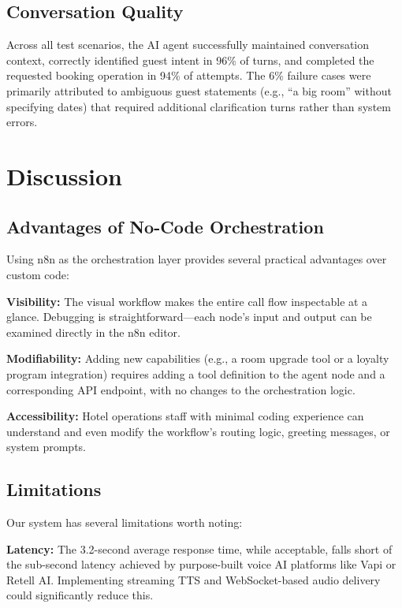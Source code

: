\documentclass[conference]{IEEEtran}
\begin{document}
\subsection{Conversation Quality}

Across all test scenarios, the AI agent successfully maintained conversation context, correctly identified guest intent in 96\% of turns, and completed the requested booking operation in 94\% of attempts. The 6\% failure cases were primarily attributed to ambiguous guest statements (e.g., ``a big room'' without specifying dates) that required additional clarification turns rather than system errors.

\section{Discussion}

\subsection{Advantages of No-Code Orchestration}

Using n8n as the orchestration layer provides several practical advantages over custom code:

\textbf{Visibility:} The visual workflow makes the entire call flow inspectable at a glance. Debugging is straightforward---each node's input and output can be examined directly in the n8n editor.

\textbf{Modifiability:} Adding new capabilities (e.g., a room upgrade tool or a loyalty program integration) requires adding a tool definition to the agent node and a corresponding API endpoint, with no changes to the orchestration logic.

\textbf{Accessibility:} Hotel operations staff with minimal coding experience can understand and even modify the workflow's routing logic, greeting messages, or system prompts.

\subsection{Limitations}

Our system has several limitations worth noting:

\textbf{Latency:} The 3.2-second average response time, while acceptable, falls short of the sub-second latency achieved by purpose-built voice AI platforms like Vapi or Retell AI. Implementing streaming TTS and WebSocket-based audio delivery could significantly reduce this.
\end{document}
